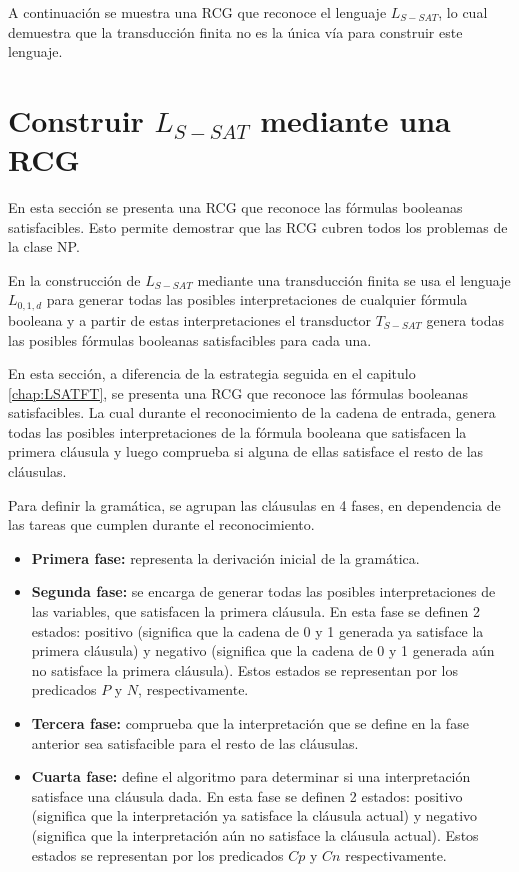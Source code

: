 \documentclass[12pt]{article}
\begin{document}
A continuación se muestra una RCG que reconoce el lenguaje $L_{S-SAT}$, lo cual demuestra que la transducción
finita no es la única vía para construir este lenguaje.

\section{Construir $L_{S-SAT}$ mediante una RCG}

En esta sección se presenta una RCG que reconoce las fórmulas booleanas satisfacibles. Esto permite demostrar 
que las RCG cubren todos los problemas de la clase NP.

En la construcción de $L_{S-SAT}$ mediante una transducción finita se usa el lenguaje $L_{0,1,d}$ para generar todas las posibles interpretaciones de cualquier fórmula booleana y a partir de estas interpretaciones el transductor $T_{S-SAT}$ genera todas las posibles fórmulas booleanas satisfacibles para cada una. 

En esta sección, a diferencia de la estrategia seguida en el capitulo \ref{chap:LSATFT}, se presenta una RCG que 
reconoce las fórmulas booleanas satisfacibles. La cual durante el reconocimiento de la cadena de entrada, genera todas las posibles interpretaciones de la fórmula booleana que satisfacen la primera cláusula y luego comprueba si alguna de ellas satisface el resto de las cláusulas.

Para definir la gramática, se agrupan las cláusulas en 4 fases, en dependencia de las tareas que cumplen durante el reconocimiento.

\begin{itemize}
    \item \textbf{Primera fase:} representa la derivación inicial de la gramática.
    \item \textbf{Segunda fase:} se encarga de generar todas las posibles interpretaciones de las variables, que satisfacen la primera cláusula. En esta fase se definen 2 estados: positivo (significa que la cadena de 0 y 1 generada ya satisface la primera cláusula) y negativo (significa que la cadena de 0 y 1 generada aún no satisface la primera cláusula). Estos estados se representan por los predicados $P$ y $N$, respectivamente.
    \item \textbf{Tercera fase:} comprueba que la interpretación que se define en la fase anterior sea satisfacible para el resto de las cláusulas.
    \item \textbf{Cuarta fase:} define el algoritmo para determinar si una interpretación satisface una cláusula dada. En esta fase se definen 2 estados: positivo (significa que la interpretación ya satisface la cláusula actual) y negativo (significa que la interpretación aún no satisface la cláusula actual). Estos estados se representan por los predicados $Cp$ y $Cn$ respectivamente.
\end{itemize}
\end{document}
